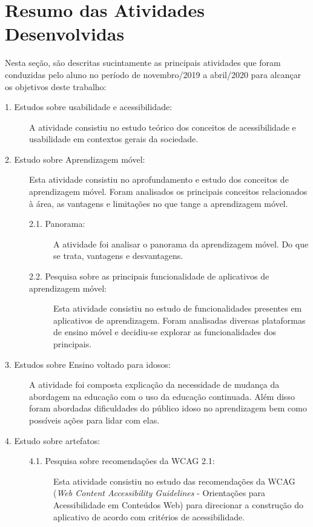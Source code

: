 \chapter{Resumo das Atividades Desenvolvidas} \label{sec:resumo_ativ}
Nesta seção, são descritas sucintamente as principais atividades que foram conduzidas pelo aluno no período de novembro/2019 a abril/2020 para alcançar os objetivos deste trabalho:

\begin{description}
\item[1. Estudos sobre usabilidade e acessibilidade:]
A atividade consistiu no estudo teórico dos conceitos de acessibilidade e usabilidade em contextos gerais da sociedade.

\item[2. Estudo sobre Aprendizagem móvel:] Esta atividade consistiu no aprofundamento e estudo dos conceitos de aprendizagem móvel. Foram analisados os principais conceitos relacionados à área, as vantagens e limitações no que tange a aprendizagem móvel. 

\begin{description}
    \item[2.1. Panorama:]
    A atividade foi analisar o panorama da aprendizagem móvel. Do que se trata, vantagens e desvantagens.
    
    \item[2.2. Pesquisa sobre as principais funcionalidade de aplicativos de aprendizagem móvel:]
    Esta atividade consistiu no estudo de funcionalidades presentes em aplicativos de aprendizagem. Foram analisadas diversas plataformas de ensino móvel e decidiu-se explorar as funcionalidades dos principais.
\end{description}

\item[3. Estudos sobre Ensino voltado para idosos:]
A atividade foi composta explicação da necessidade de mudança da abordagem na educação com o uso da educação continuada. Além disso foram abordadas dificuldades do público idoso no aprendizagem bem como possíveis ações para lidar com elas.

\item[4. Estudo sobre artefatos:]
\hfill

\begin{description}
    \item[4.1. Pesquisa sobre recomendações da WCAG 2.1:]
    Esta atividade consistiu no estudo das recomendações da WCAG (\textit{Web Content Accessibility Guidelines} - Orientações para Acessibilidade em Conteúdos Web) para direcionar a construção do aplicativo de acordo com critérios de acessibilidade.
    

\end{description}
\end{description}
